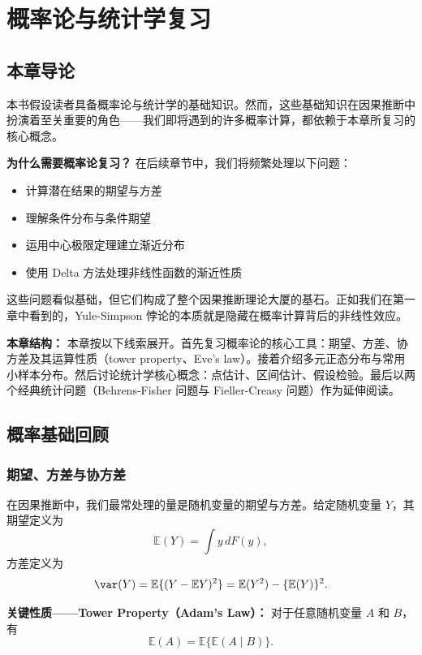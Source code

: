 
\chapter{概率论与统计学复习}

\section{本章导论}

本书假设读者具备概率论与统计学的基础知识。然而，这些基础知识在因果推断中扮演着至关重要的角色——我们即将遇到的许多概率计算，都依赖于本章所复习的核心概念。

\textbf{为什么需要概率论复习？}
在后续章节中，我们将频繁处理以下问题：
\begin{itemize}
  \item 计算潜在结果的期望与方差
  \item 理解条件分布与条件期望
  \item 运用中心极限定理建立渐近分布
  \item 使用 Delta 方法处理非线性函数的渐近性质
\end{itemize}

这些问题看似基础，但它们构成了整个因果推断理论大厦的基石。正如我们在第一章中看到的，Yule-Simpson 悖论的本质就是隐藏在概率计算背后的非线性效应。

\textbf{本章结构：}
本章按以下线索展开。首先复习概率论的核心工具：期望、方差、协方差及其运算性质（tower property、Eve's law）。接着介绍多元正态分布与常用小样本分布。然后讨论统计学核心概念：点估计、区间估计、假设检验。最后以两个经典统计问题（Behrens-Fisher 问题与 Fieller-Creasy 问题）作为延伸阅读。

\section{概率基础回顾}

\subsection{期望、方差与协方差}

在因果推断中，我们最常处理的量是随机变量的期望与方差。给定随机变量 $Y$，其期望定义为
\[
\mathbb{E}(Y) = \int y \, dF(y),
\]
方差定义为
\[
\var(Y) = \mathbb{E}\{(Y - \mathbb{E}Y)^2\} = \mathbb{E}(Y^2) - \{\mathbb{E}(Y)\}^2 .
\]

\textbf{关键性质——Tower Property（Adam's Law）：} 对于任意随机变量 $A$ 和 $B$，有
\begin{equation}\label{eq:tower-property}
\mathbb{E}(A) = \mathbb{E}\{\mathbb{E}(A \mid B)\}.
\end{equation}

